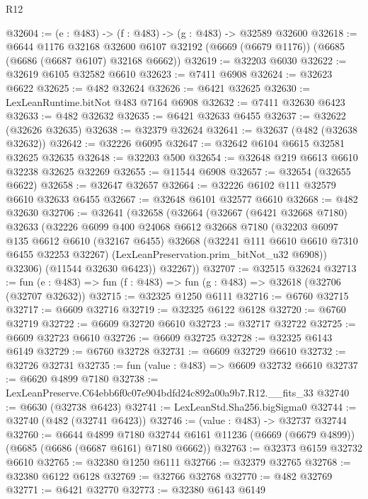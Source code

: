 \begin{lexlean}{R12}
\begin{coremodule}
@32604 := (e : @483) -> (f : @483) -> (g : @483) -> @32589 @32600
@32618 := @6644
    @1176
    @32168
    @32600
    @6107
    @32192
    (@6669 (@6679 @1176))
    (@6685 (@6686 (@6687 @6107) @32168 @6662))
@32619 := @32203 @6030
@32622 := @32619 @6105 @32582 @6610
@32623 := @7411 @6908
@32624 := @32623 @6622
@32625 := @482 @32624
@32626 := @6421 @32625
@32630 := LexLeanRuntime.bitNot @483 @7164 @6908
@32632 := @7411 @32630 @6423
@32633 := @482 @32632
@32635 := @6421 @32633 @6455
@32637 := @32622 (@32626 @32635)
@32638 := @32379 @32624
@32641 := @32637 (@482 (@32638 @32632))
@32642 := @32226 @6095
@32647 := @32642 @6104 @6615 @32581 @32625 @32635
@32648 := @32203 @500
@32654 := @32648 @219 @6613 @6610 @32238 @32625 @32269
@32655 := @11544 @6908
@32657 := @32654 (@32655 @6622)
@32658 := @32647 @32657
@32664 := @32226 @6102 @111 @32579 @6610 @32633 @6455
@32667 := @32648 @6101 @32577 @6610
@32668 := @482 @32630
@32706 := @32641
    (@32658
      (@32664
        (@32667
          (@6421 @32668 @7180)
          @32633
          (@32226
            @6099
            @400
            @24068
            @6612
            @32668
            @7180
            (@32203
              @6097
              @135
              @6612
              @6610
              (@32167 @6455)
              @32668
              (@32241 @111 @6610 @6610 @7310 @6455 @32253 @32267)
              (LexLeanPreservation.prim_bitNot_u32 @6908))
            @32306)
          (@11544 @32630 @6423))
        @32267))
@32707 := @32515 @32624
@32713 := fun (e : @483) => fun (f : @483) => fun (g : @483) => @32618 (@32706 (@32707 @32632))
@32715 := @32325 @1250 @6111
@32716 := @6760 @32715
@32717 := @6609 @32716
@32719 := @32325 @6122 @6128
@32720 := @6760 @32719
@32722 := @6609 @32720 @6610
@32723 := @32717 @32722
@32725 := @6609 @32723 @6610
@32726 := @6609 @32725
@32728 := @32325 @6143 @6149
@32729 := @6760 @32728
@32731 := @6609 @32729 @6610
@32732 := @32726 @32731
@32735 := fun (value : @483) => @6609 @32732 @6610
@32737 := @6620 @4899 @7180
@32738 := LexLeanPreserve.C64ebb6f0c07e904bdfd24c892a00a9b7.R12.__fits_33
@32740 := @6630 (@32738 @6423)
@32741 := LexLeanStd.Sha256.bigSigma0
@32744 := @32740 (@482 (@32741 @6423))
@32746 := (value : @483) -> @32737 @32744
@32760 := @6644
    @4899
    @7180
    @32744
    @6161
    @11236
    (@6669 (@6679 @4899))
    (@6685 (@6686 (@6687 @6161) @7180 @6662))
@32763 := @32373 @6159 @32732 @6610
@32765 := @32380 @1250 @6111
@32766 := @32379 @32765
@32768 := @32380 @6122 @6128
@32769 := @32766 @32768
@32770 := @482 @32769
@32771 := @6421 @32770
@32773 := @32380 @6143 @6149

\end{coremodule}
\end{lexlean}
